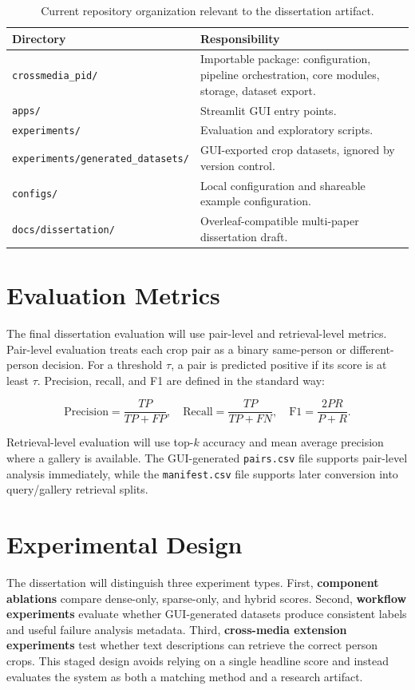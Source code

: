 \begin{table}[htbp]
  \centering
  \caption{Current repository organization relevant to the dissertation artifact.}
  \label{tab:repo-structure}
  \begin{tabularx}{\textwidth}{lX}
    \toprule
    Directory & Responsibility \\
    \midrule
    \texttt{crossmedia\_pid/} & Importable package: configuration, pipeline orchestration, core modules, storage, dataset export. \\
    \texttt{apps/} & Streamlit GUI entry points. \\
    \texttt{experiments/} & Evaluation and exploratory scripts. \\
    \texttt{experiments/generated\_datasets/} & GUI-exported crop datasets, ignored by version control. \\
    \texttt{configs/} & Local configuration and shareable example configuration. \\
    \texttt{docs/dissertation/} & Overleaf-compatible multi-paper dissertation draft. \\
    \bottomrule
  \end{tabularx}
\end{table}

\section{Evaluation Metrics}

The final dissertation evaluation will use pair-level and retrieval-level metrics. Pair-level evaluation treats each crop pair as a binary same-person or different-person decision. For a threshold $\tau$, a pair is predicted positive if its score is at least $\tau$. Precision, recall, and F1 are defined in the standard way:

\begin{equation}
\mathrm{Precision} = \frac{TP}{TP + FP}, \quad
\mathrm{Recall} = \frac{TP}{TP + FN}, \quad
\mathrm{F1} = \frac{2PR}{P + R}.
\end{equation}

Retrieval-level evaluation will use top-$k$ accuracy and mean average precision where a gallery is available. The GUI-generated \texttt{pairs.csv} file supports pair-level analysis immediately, while the \texttt{manifest.csv} file supports later conversion into query/gallery retrieval splits.

\section{Experimental Design}

The dissertation will distinguish three experiment types. First, \textbf{component ablations} compare dense-only, sparse-only, and hybrid scores. Second, \textbf{workflow experiments} evaluate whether GUI-generated datasets produce consistent labels and useful failure analysis metadata. Third, \textbf{cross-media extension experiments} test whether text descriptions can retrieve the correct person crops. This staged design avoids relying on a single headline score and instead evaluates the system as both a matching method and a research artifact.

